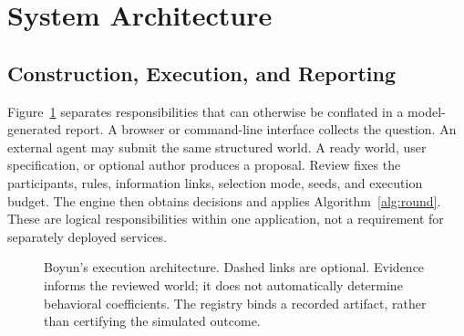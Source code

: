\section{System Architecture}\label{sec:system}
\subsection{Construction, Execution, and Reporting}
Figure~\ref{fig:architecture} separates responsibilities that can otherwise
be conflated in a model-generated report. A browser or command-line interface
collects the question. An external agent may submit the same structured world.
A ready world, user specification, or optional author
produces a proposal. Review fixes the participants, rules, information links,
selection mode, seeds, and execution budget. The engine then obtains decisions
and applies Algorithm~\ref{alg:round}. These are logical responsibilities within
one application, not a requirement for separately deployed services.

\begin{figure}[t]
\centering
{}
\caption{Boyun's execution architecture. Dashed links are optional. Evidence
informs the reviewed world; it does not automatically determine behavioral
coefficients. The registry binds a recorded artifact, rather than certifying
the simulated outcome.}
\label{fig:architecture}
\end{figure}

